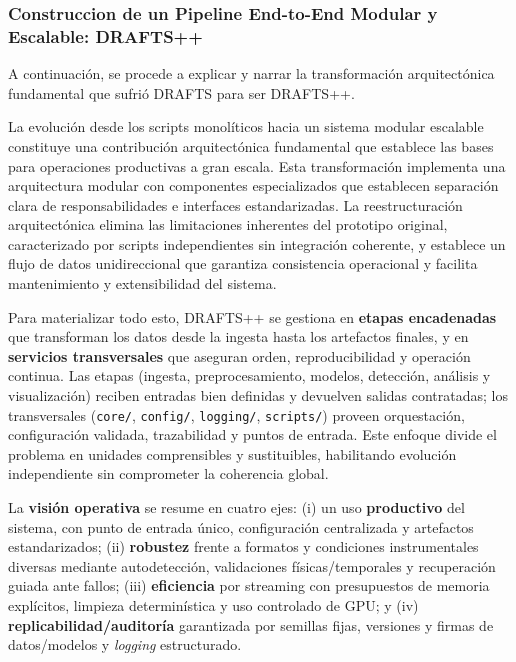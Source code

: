 \subsubsection{Construccion de un Pipeline End-to-End Modular y Escalable: DRAFTS++}


A continuación, se procede a explicar y narrar la transformación arquitectónica fundamental que sufrió DRAFTS para ser DRAFTS++. 

La evolución desde los scripts monolíticos hacia un sistema modular escalable constituye una contribución arquitectónica fundamental que establece las bases para operaciones productivas a gran escala. Esta transformación implementa una arquitectura modular con componentes especializados que establecen separación clara de responsabilidades e interfaces estandarizadas. La reestructuración arquitectónica elimina las limitaciones inherentes del prototipo original, caracterizado por scripts independientes sin integración coherente, y establece un flujo de datos unidireccional que garantiza consistencia operacional y facilita mantenimiento y extensibilidad del sistema.

Para materializar todo esto, DRAFTS++ se gestiona en \textbf{etapas encadenadas} que transforman los datos desde la ingesta hasta los artefactos finales, y en \textbf{servicios transversales} que aseguran orden, reproducibilidad y operación continua. Las etapas (ingesta, preprocesamiento, modelos, detección, análisis y visualización) reciben entradas bien definidas y devuelven salidas contratadas; los transversales (\texttt{core/}, \texttt{config/}, \texttt{logging/}, \texttt{scripts/}) proveen orquestación, configuración validada, trazabilidad y puntos de entrada. Este enfoque divide el problema en unidades comprensibles y sustituibles, habilitando evolución independiente sin comprometer la coherencia global.

La \textbf{visión operativa} se resume en cuatro ejes: (i) un uso \textbf{productivo} del sistema, con punto de entrada único, configuración centralizada y artefactos estandarizados; (ii) \textbf{robustez} frente a formatos y condiciones instrumentales diversas mediante autodetección, validaciones físicas/temporales y recuperación guiada ante fallos; (iii) \textbf{eficiencia} por streaming con presupuestos de memoria explícitos, limpieza determinística y uso controlado de GPU; y (iv) \textbf{replicabilidad/auditoría} garantizada por semillas fijas, versiones y firmas de datos/modelos y \emph{logging} estructurado.

